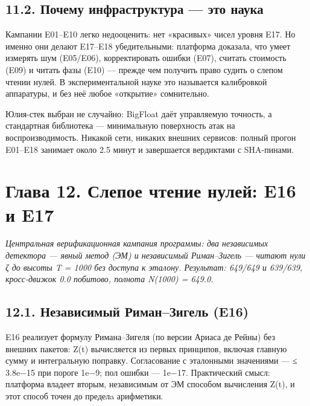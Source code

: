 \documentclass[11pt,a4paper]{article}
\begin{document}
\subsection{11.2. Почему инфраструктура — это наука}

Кампании E01–E10 легко недооценить: нет «красивых» чисел уровня E17. Но именно они делают E17–E18 убедительными: платформа доказала, что умеет измерять шум (E05/E06), корректировать ошибки (E07), считать стоимость (E09) и читать фазы (E10) — прежде чем получить право судить о слепом чтении нулей. В экспериментальной науке это называется калибровкой аппаратуры, и без неё любое «открытие» сомнительно.

Юлия-стек выбран не случайно: BigFloat даёт управляемую точность, а стандартная библиотека — минимальную поверхность атак на воспроизводимость. Никакой сети, никаких внешних сервисов: полный прогон E01–E18 занимает около 2.5 минут и завершается вердиктами с SHA-пинами.

\section{Глава 12. Слепое чтение нулей: E16 и E17}

\noindent\textit{\color{copper}Центральная верификационная кампания программы: два независимых детектора — явный метод (ЭМ) и независимый Риман–Зигель — читают нули ζ до высоты T = 1000 без доступа к эталону. Результат: 649/649 и 639/639, кросс-движок 0.0 побитово, полнота N(1000) = 649.0.}

\subsection{12.1. Независимый Риман–Зигель (E16)}

E16 реализует формулу Римана–Зигеля (по версии Ариаса де Рейны) без внешних пакетов: Z(t) вычисляется из первых принципов, включая главную сумму и интегральную поправку. Согласование с эталонными значениями — ≤ 3.8e−15 при пороге 1e−9; пол ошибки — 1e−17. Практический смысл: платформа владеет вторым, независимым от ЭМ способом вычисления Z(t), и этот способ точен до пределa арифметики.

\begin{center}\end{center}
\end{document}
